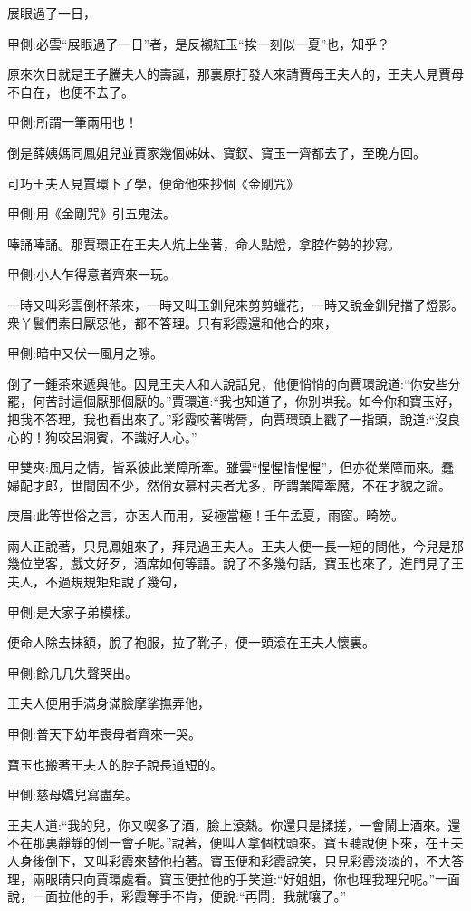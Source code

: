 \begin{parag}
    展眼過了一日，\begin{note}甲側:必雲“展眼過了一日”者，是反襯紅玉“挨一刻似一夏”也，知乎？\end{note}原來次日就是王子騰夫人的壽誕，那裏原打發人來請賈母王夫人的，王夫人見賈母不自在，也便不去了。\begin{note}甲側:所謂一筆兩用也！\end{note}倒是薛姨媽同鳳姐兒並賈家幾個姊妹、寶釵、寶玉一齊都去了，至晚方回。
\end{parag}


\begin{parag}
    可巧王夫人見賈環下了學，便命他來抄個《金剛咒》\begin{note}甲側:用《金剛咒》引五鬼法。\end{note}唪誦唪誦。那賈環正在王夫人炕上坐著，命人點燈，拿腔作勢的抄寫。\begin{note}甲側:小人乍得意者齊來一玩。\end{note}一時又叫彩雲倒杯茶來，一時又叫玉釧兒來剪剪蠟花，一時又說金釧兒擋了燈影。衆丫鬟們素日厭惡他，都不答理。只有彩霞還和他合的來，\begin{note}甲側:暗中又伏一風月之隙。\end{note}倒了一鍾茶來遞與他。因見王夫人和人說話兒，他便悄悄的向賈環說道:“你安些分罷，何苦討這個厭那個厭的。”賈環道:“我也知道了，你別哄我。如今你和寶玉好，把我不答理，我也看出來了。”彩霞咬著嘴脣，向賈環頭上戳了一指頭，說道:“沒良心的！狗咬呂洞賓，不識好人心。”\begin{note}甲雙夾:風月之情，皆系彼此業障所牽。雖雲“惺惺惜惺惺”，但亦從業障而來。蠢婦配才郎，世間固不少，然俏女慕村夫者尤多，所謂業障牽魔，不在才貌之論。\end{note}\begin{note}庚眉:此等世俗之言，亦因人而用，妥極當極！壬午孟夏，雨窗。畸笏。\end{note}
\end{parag}


\begin{parag}
    兩人正說著，只見鳳姐來了，拜見過王夫人。王夫人便一長一短的問他，今兒是那幾位堂客，戲文好歹，酒席如何等語。說了不多幾句話，寶玉也來了，進門見了王夫人，不過規規矩矩說了幾句，\begin{note}甲側:是大家子弟模樣。\end{note}便命人除去抹額，脫了袍服，拉了靴子，便一頭滾在王夫人懷裏。\begin{note}甲側:餘几几失聲哭出。\end{note}王夫人便用手滿身滿臉摩挲撫弄他，\begin{note}甲側:普天下幼年喪母者齊來一哭。\end{note}寶玉也搬著王夫人的脖子說長道短的。\begin{note}甲側:慈母嬌兒寫盡矣。\end{note}王夫人道:“我的兒，你又喫多了酒，臉上滾熱。你還只是揉搓，一會鬧上酒來。還不在那裏靜靜的倒一會子呢。”說著，便叫人拿個枕頭來。寶玉聽說便下來，在王夫人身後倒下，又叫彩霞來替他拍著。寶玉便和彩霞說笑，只見彩霞淡淡的，不大答理，兩眼睛只向賈環處看。寶玉便拉他的手笑道:“好姐姐，你也理我理兒呢。”一面說，一面拉他的手，彩霞奪手不肯，便說:“再鬧，我就嚷了。”
\end{parag}



